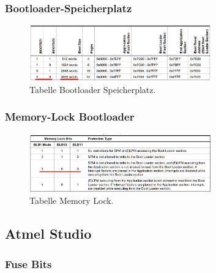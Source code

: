 
\subsubsection{Bootloader-Speicherplatz}\label{Appendix:Bootloader-Speicherplatz}

\begin{figure}[H]
	\centering
	\includegraphics[width=0.7\textwidth]{graphics/Tabelle_Bootloader}
	\caption{Tabelle Bootloader Speicherplatz.}
	\label{fig:Tabelle_Bootloader}
\end{figure}


\subsubsection{Memory-Lock Bootloader}

\begin{figure}[H]
	\centering
	\includegraphics[width=0.7\textwidth]{graphics/Tabelle_Memory_Lock}
	\caption{Tabelle Memory Lock.}
	\label{fig:Tabelle_Memory_Lock}
\end{figure}


\subsection{Atmel Studio}

\subsubsection{Fuse Bits}

